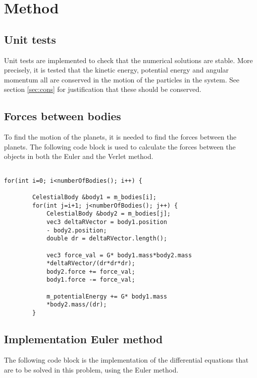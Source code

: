 \section{Method}

\subsection{Unit tests}
Unit tests are implemented to check that the numerical solutions are stable. More precisely, it is tested that the kinetic energy, potential energy and angular momentum all are conserved in the motion of the particles in the system. See section \ref{sec:cons} for justification that these should be conserved. 

\subsection{Forces between bodies}
To find the motion of the planets, it is needed to find the forces between the planets. The following code block is used to calculate the forces between the objects in both the Euler and the Verlet method. 
\begin{lstlisting}[frame=single]
  
for(int i=0; i<numberOfBodies(); i++) {

        CelestialBody &body1 = m_bodies[i];
        for(int j=i+1; j<numberOfBodies(); j++) {
            CelestialBody &body2 = m_bodies[j];
            vec3 deltaRVector = body1.position 
            - body2.position;
            double dr = deltaRVector.length();

            vec3 force_val = G* body1.mass*body2.mass
            *deltaRVector/(dr*dr*dr);
            body2.force += force_val;
            body1.force -= force_val;

            m_potentialEnergy += G* body1.mass
            *body2.mass/(dr);
        }
\end{lstlisting}

\subsection{Implementation Euler method}
The following code block is the implementation of the differential equations that are to be solved in this problem, using the Euler method. 

